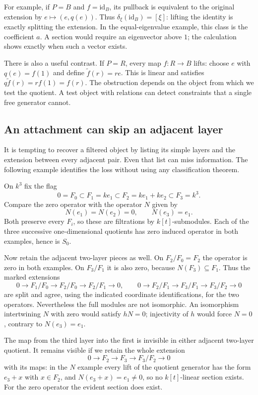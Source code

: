 \documentclass[11pt]{article}
\theoremstyle{definition}
\theoremstyle{remark}\newtheorem{remark}[theorem]{Remark}
\newcommand{\id}{\mathrm{id}}
\begin{document}
For example, if $P=B$ and $f=\id_B$, its pullback is equivalent to
the original extension by $e\mapsto(e,q(e))$. Thus
$\delta_\xi(\id_B)=[\xi]$: lifting the identity is exactly splitting
the extension. In the equal-eigenvalue example, this class is the
coefficient $a$. A section would require an eigenvector above $1$;
the calculation shows exactly when such a vector exists.

There is also a useful contrast. If $P=R$, every map $f:R\to B$ lifts:
choose $e$ with $q(e)=f(1)$ and define $\widetilde f(r)=re$. This is
linear and satisfies $q\widetilde f(r)=r f(1)=f(r)$. The obstruction
depends on the object from which we test the quotient. A test object
with relations can detect constraints that a single free generator
cannot.

\subsection{An attachment can skip an adjacent layer}\label{x:skip-layer}

It is tempting to recover a filtered object by listing its simple
layers and the extension between every adjacent pair. Even that list
can miss information. The following example identifies the loss without
using any classification theorem.

On $k^3$ fix the flag
\[
0=F_0\subset F_1=ke_1\subset F_2=ke_1+ke_2\subset F_3=k^3.
\]
Compare the zero operator with the operator $N$ given by
\[
N(e_1)=N(e_2)=0,\qquad N(e_3)=e_1.
\]
Both preserve every $F_i$, so these are filtrations by $k[t]$-submodules.
Each of the three successive one-dimensional quotients has zero induced
operator in both examples, hence is $S_0$.

Now retain the adjacent two-layer pieces as well. On $F_2/F_0=F_2$
the operator is zero in both examples. On $F_3/F_1$ it is also zero,
because $N(F_3)\subseteq F_1$. Thus the marked extensions
\[
0\to F_1/F_0\to F_2/F_0\to F_2/F_1\to0,
\qquad
0\to F_2/F_1\to F_3/F_1\to F_3/F_2\to0
\]
are split and agree, using the indicated coordinate identifications,
for the two operators. Nevertheless the full modules are not
isomorphic. An isomorphism intertwining $N$ with zero would satisfy
$hN=0$; injectivity of $h$ would force $N=0$, contrary to $N(e_3)=e_1$.

The map from the third layer into the first is invisible in either
adjacent two-layer quotient. It remains visible if we retain the whole
extension
\[
0\longrightarrow F_2\longrightarrow F_3\longrightarrow F_3/F_2
\longrightarrow0
\]
with its maps: in the $N$ example every lift of the quotient generator
has the form $e_3+x$ with $x\in F_2$, and $N(e_3+x)=e_1\ne0$,
so no $k[t]$-linear section exists. For the zero operator the evident
section does exist.
\end{document}
